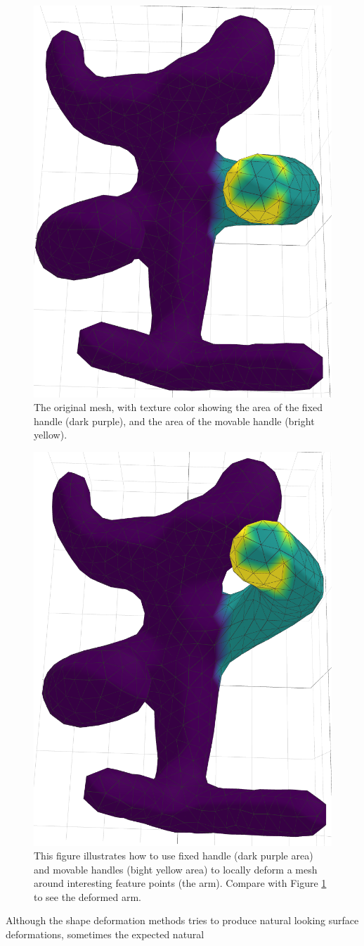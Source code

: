 \documentclass{6838publ}
\begin{document}
\begin{figure}[t!]  \centering
  \includegraphics[width=.5\linewidth]{original_handle}
  \caption{The original mesh, with texture color showing the area of
the fixed handle (dark purple), and the area of the movable handle
(bright yellow). }
  \label{fig:original_handle}
\end{figure}
\begin{figure}[t!]  \centering
  \includegraphics[width=.5\linewidth]{stretched_handle}
\caption{This figure illustrates how to use fixed handle (dark purple
area) and movable handles (bight yellow area) to locally deform a
mesh around interesting feature points (the arm).  Compare with Figure
\ref{fig:original_handle} to see the deformed arm.}
    \label{fig:stretched_handle}
\end{figure} Although the shape deformation methods tries to produce
natural looking surface deformations, sometimes the expected natural
\end{document}
